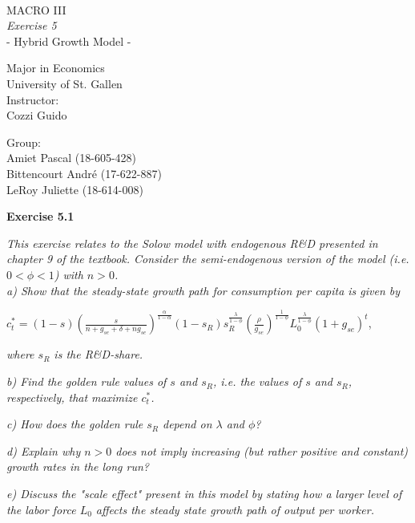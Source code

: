 \documentclass[11pt]{article} %
\begin{document}
\thispagestyle{empty}
\ \vspace{1.0cm}
\begin{center}
{\LARGE
MACRO III \\
\textit{Exercise 5} \\
{\small - Hybrid Growth Model -}\\[2cm]
}

{
Major in Economics \\
{University of St. Gallen} \\ [2cm]
Instructor:\\
Cozzi Guido \\[2cm]
}

{
Group:\\
Amiet Pascal (18-605-428)\\
Bittencourt André (17-622-887)\\
LeRoy Juliette (18-614-008)\\
}
\end{center}

\pagebreak

\textbf{\Large{Exercise 5.1}}

\textit{This exercise relates to the Solow model with endogenous R\&D presented in chapter 9 of the textbook. Consider the semi-endogenous version of the model (i.e. $0 < \phi < 1$) with $n > 0$.}\\

\textit{a) Show that the steady-state growth path for consumption per capita is given by}
\begin{center}
    $c_t^* = (1-s)\left(\frac{s}{n+g_{se}+\delta+ng_{se}}\right)^{\frac{\alpha}{1-\alpha}}(1-s_{R})s_R^{\frac{\lambda}{1-\phi}}\left(\frac{\rho}{g_{se}} \right)^{\frac{1}{1-\phi}}L_0^{\frac{\lambda}{1-\phi}}(1+g_{se})^t$,
\end{center}
\textit{where $s_R$ is the R\&D-share.}



\pagebreak
\textit{b) Find the golden rule values of $s$ and $s_R$, i.e. the values of $s$ and $s_R$, respectively, that maximize $c_t^*$.}




\pagebreak
\textit{c) How does the golden rule $s_R$ depend on $\lambda$ and $\phi$?}




\pagebreak
\textit{d) Explain why $n > 0$ does not imply increasing (but rather positive and constant) growth rates in the long run?}




\pagebreak
\textit{e) Discuss the "scale effect" present in this model by stating how a larger level of the labor force $L_0$ affects the steady state growth path of output per worker.}
\end{document}
